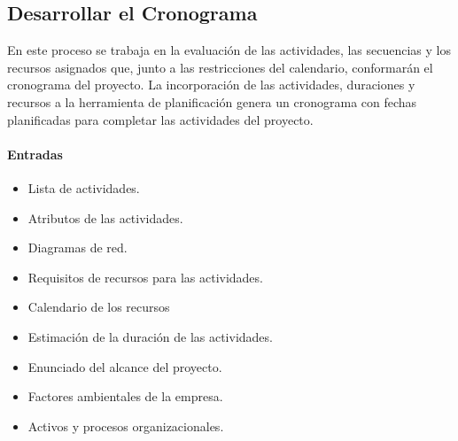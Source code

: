 \documentclass[a4paper,twosides]{article}
\newlength{\wideitemsep}
\let\olditem\item
\renewcommand{\item}{\setlength{\itemsep}{\wideitemsep}\olditem}
\begin{document}
\subsection{Desarrollar el Cronograma} \label{sec:desarrollar_cronograma}
En este proceso se trabaja en la evaluación de las actividades, las secuencias y los recursos asignados que, junto a las restricciones del calendario, conformarán el cronograma del proyecto. La incorporación de las actividades, duraciones y recursos a la herramienta de planificación genera un cronograma con fechas planificadas para completar las actividades del proyecto.

\paragraph{Entradas}
\begin{itemize}
\item Lista de actividades.
\item Atributos de las actividades.
\item Diagramas de red.
\item Requisitos de recursos para las actividades.
\item Calendario de los recursos
\item Estimación de la duración de las actividades.
\item Enunciado del alcance del proyecto.
\item Factores ambientales de la empresa.
\item Activos y procesos organizacionales.
\end{itemize}
\end{document}
